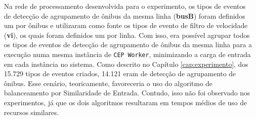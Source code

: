 Na rede de processamento desenvolvida para o experimento, os tipos de eventos de detecção de agrupamento de ônibus da mesma linha (\textbf{busB}) foram definidos um por ônibus e utilizaram como fonte os tipos de evento de filtro de velocidade (\textbf{vi}), os quais foram definidos um por linha. Com isso, era possível agrupar todos os tipos de eventos de detecção de agrupamento de ônibus da mesma linha para a execução numa mesma instância de \texttt{CEP Worker}, minimizando a carga de entrada em cada instância no sistema. Como descrito no Capítulo \ref{cap:experimento}, dos 15.729 tipos de eventos criados, 14.121 eram de detecção de agrupamento de ônibus. Esse cenário, teoricamente, favoreceria o uso do algoritmo de balanceamento por Similaridade de Entrada. Contudo, isso não foi observado nos experimentos, já que os dois algoritmos resultaram em tempos médios de uso de recursos similares. 

